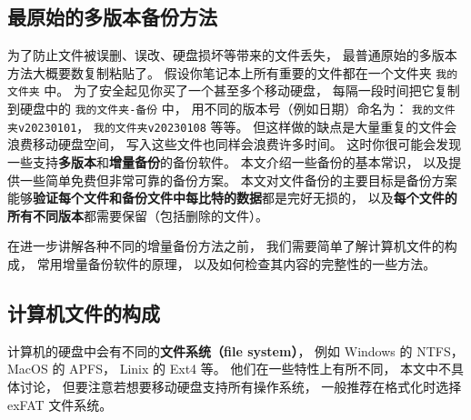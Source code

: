 
\subsection{最原始的多版本备份方法}
为了防止文件被误删、误改、硬盘损坏等带来的文件丢失， 最普通原始的多版本方法大概要数复制粘贴了。 假设你笔记本上所有重要的文件都在一个文件夹 \verb|我的文件夹| 中。 为了安全起见你买了一个甚至多个移动硬盘， 每隔一段时间把它复制到硬盘中的 \verb|我的文件夹-备份| 中， 用不同的版本号（例如日期）命名为： \verb|我的文件夹v20230101|， \verb|我的文件夹v20230108| 等等。 但这样做的缺点是大量重复的文件会浪费移动硬盘空间， 写入这些文件也同样会浪费许多时间。 这时你很可能会发现一些支持\textbf{多版本}和\textbf{增量备份}的备份软件。 本文介绍一些备份的基本常识， 以及提供一些简单免费但非常可靠的备份方案。 本文对文件备份的主要目标是备份方案能够\textbf{验证每个文件和备份文件中每比特的数据}都是完好无损的， 以及\textbf{每个文件的所有不同版本}都需要保留（包括删除的文件）。

在进一步讲解各种不同的增量备份方法之前， 我们需要简单了解计算机文件的构成， 常用增量备份软件的原理， 以及如何检查其内容的完整性的一些方法。

\subsection{计算机文件的构成}
计算机的硬盘中会有不同的\textbf{文件系统（file system）}， 例如 Windows 的 NTFS， MacOS 的 APFS， Linix 的 Ext4 等。 他们在一些特性上有所不同， 本文中不具体讨论， 但要注意若想要移动硬盘支持所有操作系统， 一般推荐在格式化时选择 exFAT 文件系统。


